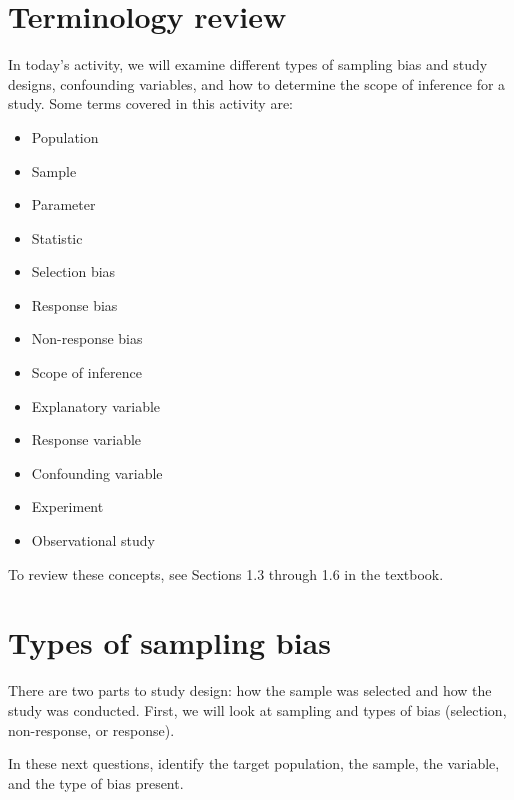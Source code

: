 \documentclass[
]{report}
\begin{document}
\hypertarget{terminology-review}{%
\section{Terminology review}\label{terminology-review}}

In today's activity, we will examine different types of sampling bias and study designs, confounding variables, and how to determine the scope of inference for a study. Some terms covered in this activity are:

\begin{itemize}
\item
  Population
\item
  Sample
\item
  Parameter
\item
  Statistic
\item
  Selection bias
\item
  Response bias
\item
  Non-response bias
\item
  Scope of inference
\item
  Explanatory variable
\item
  Response variable
\item
  Confounding variable
\item
  Experiment
\item
  Observational study
\end{itemize}

To review these concepts, see Sections 1.3 through 1.6 in the textbook.

\newpage

\hypertarget{types-of-sampling-bias}{%
\section{Types of sampling bias}\label{types-of-sampling-bias}}

There are two parts to study design: how the sample was selected and how the study was conducted. First, we will look at sampling and types of bias (selection, non-response, or response).

In these next questions, identify the target population, the sample, the variable, and the type of bias present.
\end{document}
